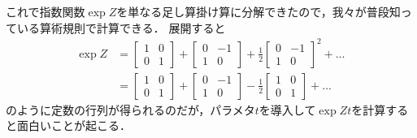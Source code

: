 \documentclass{jsbook}
\begin{document}
これで指数関数$\exp Z$を単なる足し算掛け算に分解できたので，我々が普段知っている算術規則で計算できる．
展開すると
\begin{align}
\exp Z&=\begin{bmatrix}1&0\\0&1\end{bmatrix}+\begin{bmatrix}0&-1\\1&0\end{bmatrix}+\frac{1}{2}\begin{bmatrix}0&-1\\1&0\end{bmatrix}^2+\dots\\
&=\begin{bmatrix}1&0\\0&1\end{bmatrix}+\begin{bmatrix}0&-1\\1&0\end{bmatrix}-\frac{1}{2}\begin{bmatrix}1&0\\0&1\end{bmatrix}+\dots
\end{align}
のように定数の行列が得られるのだが，パラメタ$t$を導入して$\exp Zt$を計算すると面白いことが起こる．
\end{document}
